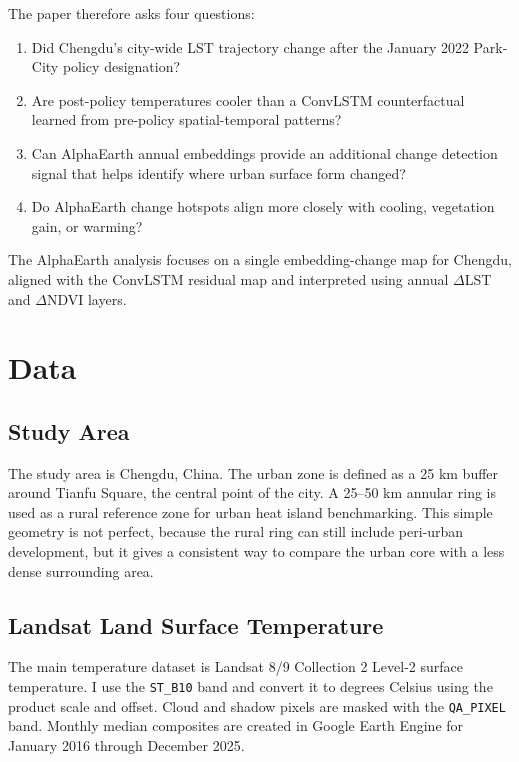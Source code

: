 \documentclass{article}
\begin{document}
The paper therefore asks four questions:
\begin{enumerate}
  \item Did Chengdu's city-wide LST trajectory change after the January 2022
  Park-City policy designation?
  \item Are post-policy temperatures cooler than a ConvLSTM counterfactual
  learned from pre-policy spatial-temporal patterns?
  \item Can AlphaEarth annual embeddings provide an additional change detection
  signal that helps identify where urban surface form changed?
  \item Do AlphaEarth change hotspots align more closely with cooling,
  vegetation gain, or warming?
\end{enumerate}

The AlphaEarth analysis focuses on a single embedding-change map for Chengdu,
aligned with the ConvLSTM residual map and interpreted using annual
$\Delta$LST and $\Delta$NDVI layers.

\section{Data}
\label{sec:data}

\subsection{Study Area}

The study area is Chengdu, China. The urban zone is defined as a 25 km buffer
around Tianfu Square, the central point of the city. A 25--50 km annular ring
is used as a rural reference zone for urban heat island benchmarking. This
simple geometry is not perfect, because the rural ring can still include
peri-urban development, but it gives a consistent way to compare the urban core
with a less dense surrounding area.

\subsection{Landsat Land Surface Temperature}

The main temperature dataset is Landsat 8/9 Collection 2 Level-2 surface
temperature. I use the \texttt{ST\_B10} band and convert it to degrees Celsius
using the product scale and offset. Cloud and shadow pixels are masked with the
\texttt{QA\_PIXEL} band. Monthly median composites are created in Google Earth
Engine for January 2016 through December 2025.
\end{document}
